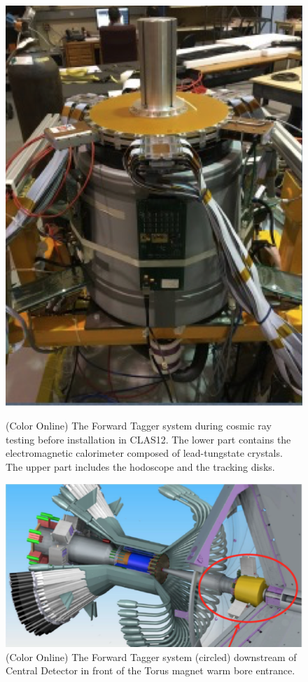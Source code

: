 \documentclass[final,3p,twocolumn]{elsarticle}
\begin{document}
\begin{figure}[t!]
\centerline{\includegraphics[width=0.75\columnwidth]{FT-photo.png}}
\caption{(Color Online) The Forward Tagger system during cosmic ray testing before installation in CLAS12. The lower part contains
the electromagnetic calorimeter composed of lead-tungstate crystals. The upper part includes the hodoscope and the
tracking disks.}
\label{ft-photo}
\vspace{1cm}\centerline{\includegraphics[width=1.0\columnwidth]{CD-FT.png}}
\caption{(Color Online) The Forward Tagger system (circled) downstream of Central Detector in front of the Torus magnet warm
bore entrance.}
\label{ft}
\end{figure}
\end{document}
